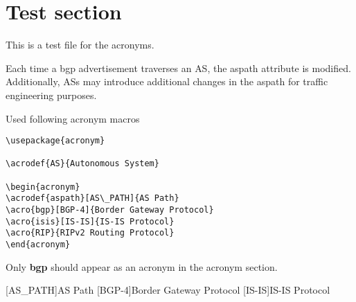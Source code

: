 \documentclass{article}
\begin{document}
\section{Test section}
This is a test file for the acronyms.

Each time a \ac{bgp} advertisement traverses an \ac{AS}, the \ac{aspath}
attribute is modified. Additionally, \acp{AS} may introduce additional
changes in the \ac{aspath} for traffic engineering purposes.

Used following acronym macros

\begin{verbatim}
\usepackage{acronym}

\acrodef{AS}{Autonomous System}

\begin{acronym}
\acrodef{aspath}[AS\_PATH]{AS Path}
\acro{bgp}[BGP-4]{Border Gateway Protocol}
\acro{isis}[IS-IS]{IS-IS Protocol}
\acro{RIP}{RIPv2 Routing Protocol}
\end{acronym}
\end{verbatim}

Only \textbf{\ac{bgp}} should appear as an acronym in the acronym section.


\begin{acronym}
[AS\_PATH]{AS Path}
[BGP-4]{Border Gateway Protocol}
[IS-IS]{IS-IS Protocol}
\end{acronym}
\end{document}
